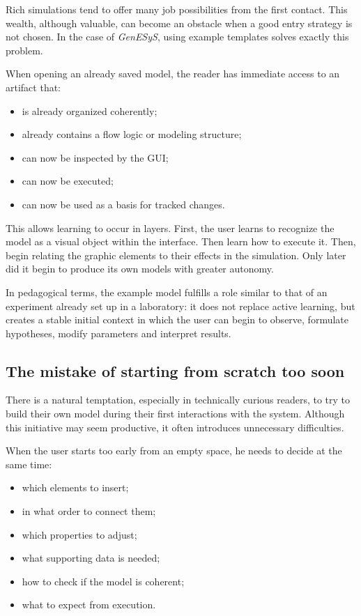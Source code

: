 Rich simulations tend to offer many job possibilities from the first contact. This wealth, although valuable, can become an obstacle when a good entry strategy is not chosen. In the case of \textit{GenESyS}, using example templates solves exactly this problem.

When opening an already saved model, the reader has immediate access to an artifact that:
\begin{itemize}
\item is already organized coherently;
\item already contains a flow logic or modeling structure;
\item can now be inspected by the GUI;
\item can now be executed;
\item can now be used as a basis for tracked changes.
\end{itemize}

This allows learning to occur in layers. First, the user learns to recognize the model as a visual object within the interface. Then learn how to execute it. Then, begin relating the graphic elements to their effects in the simulation. Only later did it begin to produce its own models with greater autonomy.

In pedagogical terms, the example model fulfills a role similar to that of an experiment already set up in a laboratory: it does not replace active learning, but creates a stable initial context in which the user can begin to observe, formulate hypotheses, modify parameters and interpret results.

\subsection{The mistake of starting from scratch too soon}
\label{subsec:cap4_erro_comecar_do_zero}

There is a natural temptation, especially in technically curious readers, to try to build their own model during their first interactions with the system. Although this initiative may seem productive, it often introduces unnecessary difficulties.

When the user starts too early from an empty space, he needs to decide at the same time:
\begin{itemize}
\item which elements to insert;
\item in what order to connect them;
\item which properties to adjust;
\item what supporting data is needed;
\item how to check if the model is coherent;
\item what to expect from execution.
\end{itemize}


